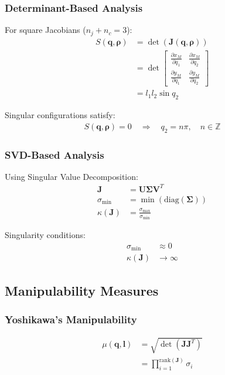 \documentclass[11pt,a4paper]{article}
\begin{document}
\subsubsection{Determinant-Based Analysis}
For square Jacobians ($n_j + n_c = 3$):
\begin{align}
S(\bm{q}, \bm{\rho}) &= \det(\bm{J}(\bm{q}, \bm{\rho})) \\
&= \det\begin{bmatrix}
\frac{\partial x_M}{\partial q_1} & \frac{\partial x_M}{\partial q_2} \\
\frac{\partial y_M}{\partial q_1} & \frac{\partial y_M}{\partial q_2}
\end{bmatrix} \\
&= l_1 l_2 \sin q_2
\end{align}

Singular configurations satisfy:
\begin{align}
S(\bm{q}, \bm{\rho}) = 0 \quad \Rightarrow \quad q_2 = n\pi, \quad n \in \mathbb{Z}
\end{align}

\subsubsection{SVD-Based Analysis}
Using Singular Value Decomposition:
\begin{align}
\bm{J} &= \bm{U} \bm{\Sigma} \bm{V}^T \\
\sigma_{\min} &= \min(\text{diag}(\bm{\Sigma})) \\
\kappa(\bm{J}) &= \frac{\sigma_{\max}}{\sigma_{\min}}
\end{align}

Singularity conditions:
\begin{align}
\sigma_{\min} &\approx 0 \\
\kappa(\bm{J}) &\to \infty
\end{align}

\subsection{Manipulability Measures}

\subsubsection{Yoshikawa's Manipulability}
\begin{align}
\mu(\bm{q}, \bm{l}) &= \sqrt{\det(\bm{J}\bm{J}^T)} \\
&= \prod_{i=1}^{\text{rank}(\bm{J})} \sigma_i
\end{align}
\end{document}

